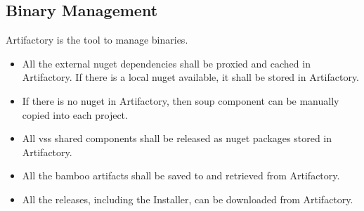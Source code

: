 \subsection{Binary Management}
Artifactory is the tool to manage binaries.
\begin{itemize}
    \item All the external nuget dependencies shall be proxied and cached in
      Artifactory. If there is a local nuget available, it shall be stored in
      Artifactory.
    \item If there is no nuget in Artifactory, then \gls{soup} component can be
    manually copied into each project.
    \item All \gls{vss} shared components shall be released as nuget packages
      stored in Artifactory.
    \item All the \gls{bamboo} artifacts shall be saved to and retrieved from
      Artifactory.
    \item All the releases, including the Installer, can be downloaded from
      Artifactory.
  \end{itemize}
